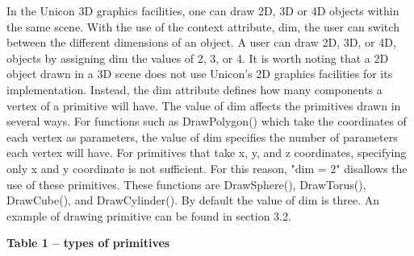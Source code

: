 \documentclass[letterpaper]{article}
\begin{document}
In the Unicon 3D graphics facilities, one can draw 2D, 3D or 4D
objects within the same scene. With the use of the context attribute,
\textsf{dim}, the user can switch between the different dimensions of
an object. A user can draw 2D, 3D, or 4D, objects by assigning
\textsf{dim} the values of 2, 3, or 4. It is worth noting that a 2D
object drawn in a 3D scene does not use Unicon's 2D graphics
facilities for its implementation. Instead, the \textsf{dim}
attribute defines how many components a vertex of a primitive will
have. The value of \textsf{dim} affects the primitives drawn in
several ways. For functions such as \textsf{DrawPolygon()} which take
the coordinates of each vertex as parameters, the value of
\textsf{dim} specifies the number of parameters each vertex will
have. For primitives that take x, y, and z coordinates, specifying
only x and y coordinate is not sufficient. For this reason,
\textsf{"dim = 2"} disallows the use of these primitives. These
functions are
\textsf{DrawSphere(), DrawTorus(), DrawCube(), and DrawCylinder()}.
By default the value of \textsf{dim} is
three. An example of drawing primitive can be found in section 3.2.


\bigskip

{\centering\bfseries
Table 1 -- types of primitives
\par}
\end{document}
